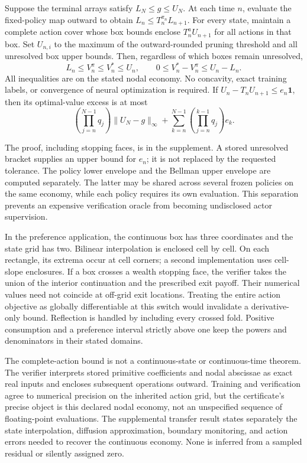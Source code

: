 \begin{proposition}\label{prop:r8-envelope}
Suppose the terminal arrays satisfy $L_N\leq g\leq U_N$. At each time $n$, evaluate the fixed-policy map outward to obtain $L_n\leq T_n^{\pi_n}L_{n+1}$. For every state, maintain a complete action cover whose box bounds enclose $T_n^aU_{n+1}$ for all actions in that box. Set $U_{n,i}$ to the maximum of the outward-rounded pruning threshold and all unresolved box upper bounds. Then, regardless of which boxes remain unresolved,
\begin{equation}\label{eq:r8-envelope}
 L_n\leq V_n^\pi\leq V_n^*\leq U_n,
 \qquad 0\leq V_n^*-V_n^\pi\leq U_n-L_n .
\end{equation}
All inequalities are on the stated nodal economy. No concavity, exact training labels, or convergence of neural optimization is required. If $U_n-T_nU_{n+1}\leq e_n\boldsymbol 1$, then its optimal-value excess is at most
\[
 \left(\prod_{j=n}^{N-1}q_j\right)\|U_N-g\|_\infty+
 \sum_{k=n}^{N-1}\left(\prod_{j=n}^{k-1}q_j\right)e_k.
\]
\end{proposition}

The proof, including stopping faces, is in the supplement. A stored unresolved bracket supplies an upper bound for $e_n$; it is not replaced by the requested tolerance. The policy lower envelope and the Bellman upper envelope are computed separately. The latter may be shared across several frozen policies on the same economy, while each policy requires its own evaluation. This separation prevents an expensive verification oracle from becoming undisclosed actor supervision.

In the preference application, the continuous box has three coordinates and the state grid has two. Bilinear interpolation is enclosed cell by cell. On each rectangle, its extrema occur at cell corners; a second implementation uses cell-slope enclosures. If a box crosses a wealth stopping face, the verifier takes the union of the interior continuation and the prescribed exit payoff. Their numerical values need not coincide at off-grid exit locations. Treating the entire action objective as globally differentiable at this switch would invalidate a derivative-only bound. Reflection is handled by including every crossed fold. Positive consumption and a preference interval strictly above one keep the powers and denominators in their stated domains.

The complete-action bound is not a continuous-state or continuous-time theorem. The verifier interprets stored primitive coefficients and nodal abscissae as exact real inputs and encloses subsequent operations outward. Training and verification agree to numerical precision on the inherited action grid, but the certificate's precise object is this declared nodal economy, not an unspecified sequence of floating-point evaluations. The supplemental transfer result states separately the state interpolation, diffusion approximation, boundary monitoring, and action errors needed to recover the continuous economy. None is inferred from a sampled residual or silently assigned zero.
